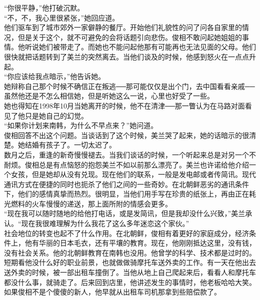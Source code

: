 “你很平静，”他打破沉默。\\

“不，不，我心里很紧张，”她回应道。\\

他们驱车到了城市郊外一家僻静的餐厅。开始他们礼貌性的问了问各自家里的情况，但是关于这个，就不可避免的会将话题引向悲伤。俊相不敢问起她姐姐的事情。他听说她们被带走了。而她也不能问起他那有可能再也无法见面的父母。他们很快就把话题转到了美兰的突然离去。当他们谈及的时候，他感到怒火在一点点升起。\\

“你应该给我点暗示，”他告诉她。\\

她辩称自己那个时候不确信正在叛逃──那可能仅仅是出个门，去中国看看亲戚──虽然他还是不怎么相信她，但是听她这么一说，心里也好受了一些。\\

她也得知在1998年10月当她离开的时候，他不在清津──那一瞥认为在马路对面看见了他只是她自己的幻觉。\\

“如果你计划来南韩，为什么不早点来？”她问道。\\

俊相回答不出这个问题。当谈话到了这个时候，美兰哭了起来，她的话暗示的很清楚。她结婚有孩子了。一切太迟了。\\

数月之后，重逢的新奇慢慢褪去。当我们谈话的时候，一个听起来总是对另一个不耐烦。俊相总是有点恼怒的抱怨美兰不如以前那么漂亮了。美兰也许诺给他介绍一个女孩，但是她却从没有兑现。现在他们的联系，一般是发电邮或者传简讯。现代通讯方式在便捷的同时也扼杀了他们之间的一些奇妙。在北朝鲜恶劣的通讯条件下，他们的感情真挚而热烈。很明显，当他们用手写在珍贵的纸张上，再由正在耗光燃料的火车慢慢的递送，那上面所附的情感会更多。\\

“现在我可以随时随地的给他打电话，或是发简讯，但是我却没什么兴致，”美兰承认。“现在我很难理解为什么我花了这么多年迷恋这个家伙。”\\

社会地位的转变也起不了什么作用。在北朝鲜，俊相有着更好的家庭成分，经济条件上，他有华丽的日本毛衣，还有平壤的教育。现在，他刚刚抵达这里，没有钱，没有社会关系。他的北朝鲜教育在南韩也没用。他曾学的科学、技术都是过时的。短期看他没什么好的职业前景，也就做做骑摩托车送外卖的工作。有一天在他出去送外卖的时候，被一部出租车撞倒了。当他从地上自己爬起来后，看看人和摩托车都没什么事，就骑走了。后来回到店里，他讲述发生的事情时，他老板哈哈大笑。如果俊相不是个傻傻的新人，他早就从出租车司机那拿到些赔偿款了。\\

